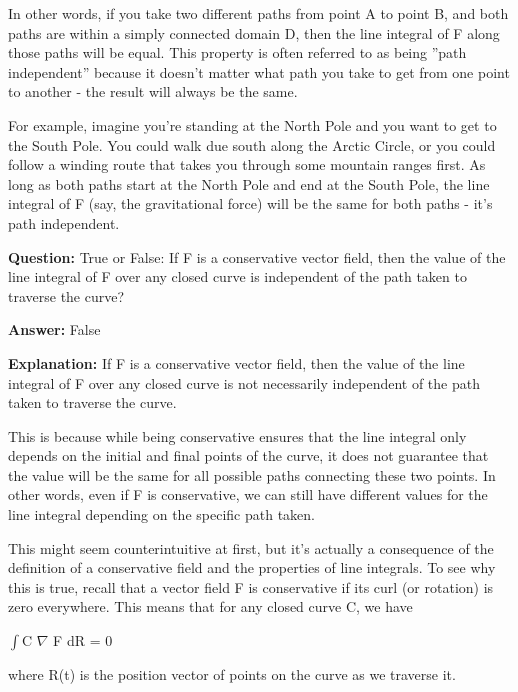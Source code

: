 \documentclass{article}
\begin{document}
In other words, if you take two different paths from point A to point B, and both paths are within a simply connected domain D, then the line integral of F along those paths will be equal. This property is often referred to as being ''path independent'' because it doesn't matter what path you take to get from one point to another - the result will always be the same.

For example, imagine you're standing at the North Pole and you want to get to the South Pole. You could walk due south along the Arctic Circle, or you could follow a winding route that takes you through some mountain ranges first. As long as both paths start at the North Pole and end at the South Pole, the line integral of F (say, the gravitational force) will be the same for both paths - it's path independent.
                
                \vspace{0.5cm} 
        
            
                \textbf {Question:} True or False: If F is a conservative vector field, then the value of the line integral of F over any closed curve is independent of the path taken to traverse the curve?
                
                \textbf{Answer:} False

                \textbf{Explanation:} If F is a conservative vector field, then the value of the line integral of F over any closed curve is not necessarily independent of the path taken to traverse the curve.

This is because while being conservative ensures that the line integral only depends on the initial and final points of the curve, it does not guarantee that the value will be the same for all possible paths connecting these two points. In other words, even if F is conservative, we can still have different values for the line integral depending on the specific path taken.

This might seem counterintuitive at first, but it's actually a consequence of the definition of a conservative field and the properties of line integrals. To see why this is true, recall that a vector field F is conservative if its curl (or rotation) is zero everywhere. This means that for any closed curve C, we have

\ensuremath{\int}C \ensuremath{\nabla} {\texttimes} F {\textperiodcentered} dR = 0

where R(t) is the position vector of points on the curve as we traverse it.
\end{document}
